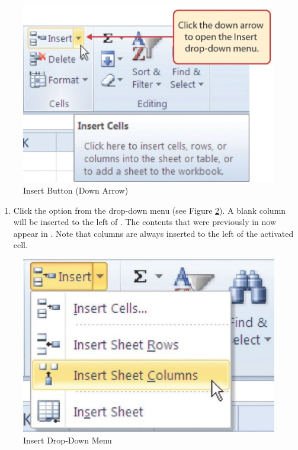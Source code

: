 \begin{figure}[H]
	\centering
	\includegraphics[width=\maxwidth{.95\linewidth}]{gfx/ch01_fig28}
	\caption{Insert Button (Down Arrow)}
	\label{01:fig28}
\end{figure}

\begin{enumerate}[resume]
	\item Click the  option from the drop-down menu (see Figure \ref{01:fig29}). A blank column will be inserted to the left of . The contents that were previously in  now appear in . Note that columns are always inserted to the left of the activated cell.

\end{enumerate}

\begin{figure}[H]
	\centering
	\includegraphics[width=\maxwidth{.95\linewidth}]{gfx/ch01_fig29}
	\caption{Insert Drop-Down Menu}
	\label{01:fig29}
\end{figure}

